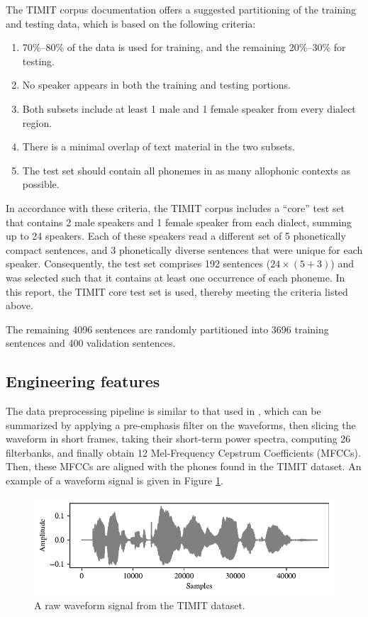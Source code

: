 		The TIMIT corpus documentation offers a suggested partitioning of the training and testing data, which is based on the following criteria:
		\begin{enumerate}
			\item 70\%--80\% of the data is used for training, and the remaining 20\%--30\% for testing.
			\item No speaker appears in both the training and testing portions.
			\item Both subsets include at least 1 male and 1 female speaker from every dialect region.
			\item There is a minimal overlap of text material in the two subsets.
			\item The test set should contain all phonemes in as many allophonic contexts as possible.
		\end{enumerate}
		In accordance with these criteria, the TIMIT corpus includes a ``core'' test set that contains 2 male speakers and 1 female speaker from each dialect, summing up to 24 speakers.
		Each of these speakers read a different set of 5 phonetically compact sentences, and 3 phonetically diverse sentences that were unique for each speaker.
		Consequently, the test set comprises 192 sentences ($24\times(5+3)$) and was selected such that it contains at least one occurrence of each phoneme.
		In this report, the TIMIT core test set is used, thereby meeting the criteria listed above.

		The remaining 4096 sentences are randomly partitioned into 3696 training sentences and 400 validation sentences.

	\subsection{Engineering features}

		The data preprocessing pipeline is similar to that used in \citet{fayek2016}, which can be summarized by applying a pre-emphasis filter on the waveforms, then slicing the waveform in short frames, taking their short-term power spectra, computing 26 filterbanks, and finally obtain 12 Mel-Frequency Cepstrum Coefficients (MFCCs).
		Then, these MFCCs are aligned with the phones found in the TIMIT dataset.
		An example of a waveform signal is given in Figure \ref{fig:signal}.
			\begin{figure}[ht]
				\centering
			    \includegraphics[width=\linewidth]{gfx/signal}
			    \caption{A raw waveform signal from the TIMIT dataset.}
			    \label{fig:signal}
			\end{figure}

